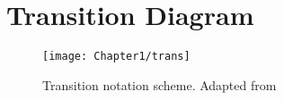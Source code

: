 
%

\chapter{Transition Diagram}\label{ap:trans}

\begin{figure}[h!]
    \centering
    \texttt{[image: Chapter1/trans]}

    \caption{Transition notation scheme. Adapted from \cite{Vitha2015}}
\end{figure}